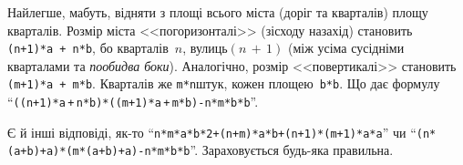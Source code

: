 \Tutorial	
Найлегше, мабуть,
відняти з площі всього міста (доріг та кварталів) площу кварталів. Розмір міста <<по\nolinebreak[3] горизонталі>> (зі\nolinebreak[3] сходу на\nolinebreak[3] захід) становить \mbox{\texttt{(n+1)*a~+~n*b}}, бо\nolinebreak[3] 
кварталів~$n$, вулиць\nolinebreak[3] ${(n\,{+}\,1)}$ (між усіма сусідніми кварталами та \emph{по\nolinebreak[3] обидва боки}). Аналогічно, розмір <<по\nolinebreak[3] вертикалі>> становить \mbox{\texttt{(m+1)*a~+~m*b}}. Кварталів же \verb"m*n"\nolinebreak[3] штук, кожен площею~\verb"b*b". 
Що дає формулу
%
``\mbox{\verb"((n+1)*a"$\,$\verb"+"$\,$\verb"n*b)"}\hspace{0.25em plus 1mm}\verb"*"\hspace{0.25em plus 1mm}\nolinebreak[3]\mbox{\verb"((m+1)*a"$\,$\verb"+"$\,$\verb"m*b)"}\hspace{0.75em plus 1em}\verb"-"\nolinebreak[2]\hspace{0.5em plus 1em}\verb"n*m*b*b"''.

Є й інші відповіді, як-то
\hspace{0.125em plus 1em}
``\verb"n*m*a*b*2"\hspace{0.25em plus 1mm}\verb"+"\hspace{0.25em plus 1mm}\nolinebreak[3]\verb"(n+m)*a*b"\hspace{0.25em plus 1mm}\verb"+"\hspace{0.25em plus 1mm}\nolinebreak[3]\verb"(n+1)*(m+1)*a*a"''
\hspace{0.125em plus 1em}
чи
\hspace{0.125em plus 1em}
``\verb"(n*(a+b)+a)"\hspace{0.25em plus 1mm}\nolinebreak[3]\verb"*"\hspace{0.25em plus 1mm}\nolinebreak[3]\verb"(m*(a+b)+a)"\hspace{0.75em plus 1em}\verb"-"\hspace{0.5em plus 1em}\nolinebreak[2]\verb"n*m*b*b"''.
\hspace{0.125em plus 1em}
Зараховується будь-яка правильна. 
